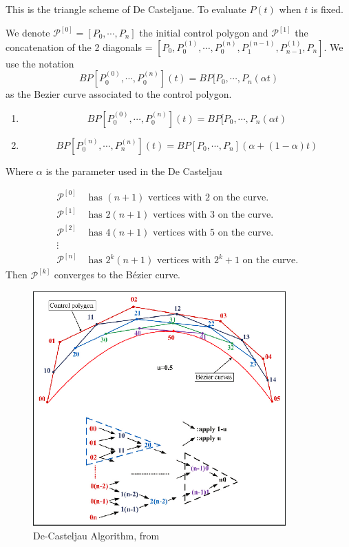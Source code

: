 This is the triangle scheme of De Casteljaue. To evaluate $ P(t) $ when $ t $ is fixed. 

We denote $ \mathscr{ P } _{  }^{ [0] } = [P_0,\cdots, P_n ]$ the initial control polygon
and $ \mathscr{ P } _{  }^{ [1] }  $ the concatenation of the 2 diagonals = $ [P_0, P _{ 0
}^{ (1)  } , \cdots, P _{ 0 }^{ (n)  } , P _{ 1 }^{ (n-1)  } , P  _{ n-1 }^{ (1) } , P _{
n }^{  } ] $. 
    We use the notation 
    \[
        BP[P _{ 0 }^{ (0) } , \cdots, P _{ 0 }^{ (n)  } ](t)  = BP[P_0, \cdots, P_n(\alpha
        t) 
    \] as the Bezier curve associated to the control polygon. 
\begin{prop}[]
    \begin{enumerate}[label={(\roman*)}]
        \item 
    \[
        BP[P _{ 0 }^{ (0) } , \cdots, P _{ 0 }^{ (n)  } ](t)  = BP[P_0, \cdots, P_n(\alpha
        t) 
    \]
\item \[BP[P _{ 0 }^{ (n)}, \cdots , P _{ n  }^{ (n)  }   ] (t) = BP[P_0, \cdots, P_n]
    \left( \alpha + \left( 1 - \alpha \right) t\right)  
\]
    \end{enumerate} 
  Where $ \alpha  $ is the parameter used in the De Casteljau 
    \label{def:}
\end{prop}

\begin{align*}
    \mathscr{ P }^{[0]} &\text{ has } \left( n+1\right) \text{ vertices with 2 on the
    curve. }\\ 
    \mathscr{ P }^{[1]} &\text{ has } 2\left( n+1\right) \text{ vertices with 3 on the
    curve. }\\ 
    \mathscr{ P }^{[2]} &\text{ has } 4\left( n+1\right) \text{ vertices with 5 on the
    curve. }\\ 
    \vdots \\ 
    \mathscr{ P }^{[n]} &\text{ has } 2^k\left( n+1\right) \text{ vertices with } 2^k+1
    \text{ on the curve. }
\end{align*}
Then $ \mathscr{ P } ^{[k]} $ converges to the Bézier curve. 


\begin{figure}[ht]
    \centering
    \includegraphics[height=9cm]{figures/General-process-of-De-Casteljau-algorithm.png}
    \caption{De-Casteljau Algorithm, from \cite{Wang-spline}}  
    \label{fig:De-casteljau-algo}
\end{figure}


